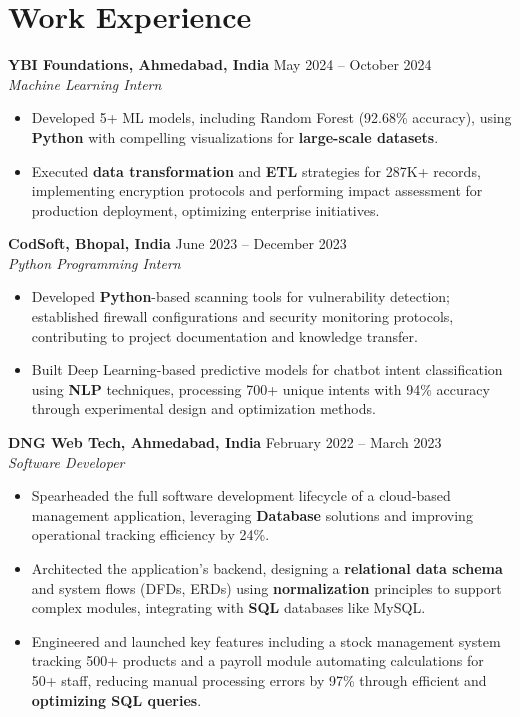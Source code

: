 \documentclass[a4paper,10pt]{article}
\begin{document}
\section*{Work Experience}
\textbf{YBI Foundations, Ahmedabad, India} \hfill May 2024 -- October 2024\\
\textit{Machine Learning Intern} \\
\begin{itemize}[leftmargin=*, itemsep=0pt, parsep=1pt]
\vspace{-6mm}
\item Developed 5+ ML models, including Random Forest (92.68\% accuracy), using \textbf{Python} with compelling visualizations for \textbf{large-scale datasets}.
\item Executed \textbf{data transformation} and \textbf{ETL} strategies for 287K+ records, implementing encryption protocols and performing impact assessment for production deployment, optimizing enterprise initiatives.
\end{itemize}
\textbf{CodSoft, Bhopal, India} \hfill June 2023 -- December 2023\\
\textit{Python Programming Intern} \\
\begin{itemize}[leftmargin=*, itemsep=0pt, parsep=1pt]
\vspace{-6mm}
\item Developed \textbf{Python}-based scanning tools for vulnerability detection; established firewall configurations and security monitoring protocols, contributing to project documentation and knowledge transfer.
\item Built Deep Learning-based predictive models for chatbot intent classification using \textbf{NLP} techniques, processing 700+ unique intents with 94\% accuracy through experimental design and optimization methods.
\vspace{-1mm}
\end{itemize}

\textbf{DNG Web Tech, Ahmedabad, India} \hfill February 2022 -- March 2023 \\
\textit{Software Developer} \\

\begin{itemize}[leftmargin=*, itemsep=0pt, parsep=1pt] %
\vspace{-7mm}
    \item Spearheaded the full software development lifecycle of a cloud-based management application, leveraging \textbf{Database} solutions and improving operational tracking efficiency by 24\%.
\item Architected the application's backend, designing a \textbf{relational data schema} and system flows (DFDs, ERDs) using \textbf{normalization} principles to support complex modules, integrating with \textbf{SQL} databases like MySQL.
\item Engineered and launched key features including a stock management system tracking 500+ products and a payroll module automating calculations for 50+ staff, reducing manual processing errors by 97\% through efficient and \textbf{optimizing SQL queries}. 

\end{itemize}
\end{document}
